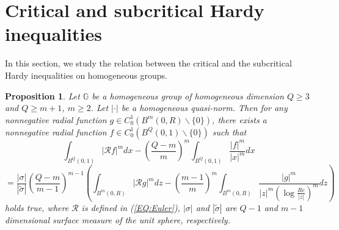 \documentclass[a4paper,12pt,reqno]{amsart}
\renewcommand\eqref[1]{(\ref{#1})} %
\numberwithin{equation}{section}
\theoremstyle{plain}
\newtheorem{prop}[thm]{Proposition}
\theoremstyle{definition}
\begin{document}
\section{Critical and subcritical Hardy inequalities}
\label{SEC:crit_subcrit_con}

In this section, we study the relation between the critical and the subcritical Hardy inequalities on homogeneous groups.

\begin{prop}\label{crit_subcrit_pr2}
Let $\mathbb{G}$ be a homogeneous group
of homogeneous dimension $Q\geq 3$ and $Q\geq m+1$, $m\geq2$. Let $|\cdot|$ be a homogeneous quasi-norm. Then for any nonnegative radial function $g\in C_{0}^{1}(B^{m}(0,R)\backslash\{0\})$, there exists a nonnegative radial function $f\in C_{0}^{1}(B^{Q}(0,1)\backslash\{0\})$ such that
$$\int_{B^{Q}(0,1)}|\mathcal{R}f|^{m}dx-\left(\frac{Q-m}{m}\right)^{m}\int_{B^{Q}(0,1)}\frac{|f|^{m}}{|x|^{m}}dx$$
\begin{equation}\label{crit_subcrit3}
=\frac{|\sigma|}
{|\widetilde{\sigma}|}\left(\frac{Q-m}{m-1}\right)^{m-1}\left(\int_{B^{m}(0,R)}|\mathcal{R}g|^{m}dz-
\left(\frac{m-1}{m}\right)^{m}\int_{B^{m}(0,R)}\frac{|g|^{m}}{|z|^{m}\left(\log\frac{Re}{|z|}\right)^{m}}dz\right)
\end{equation}
holds true, where $\mathcal{R}$ is defined in \eqref{EQ:Euler}, $|\sigma|$ and $|\widetilde{\sigma}|$ are $Q-1$ and $m-1$ dimensional surface measure of the unit sphere, respectively.
\end{prop}
\end{document}

